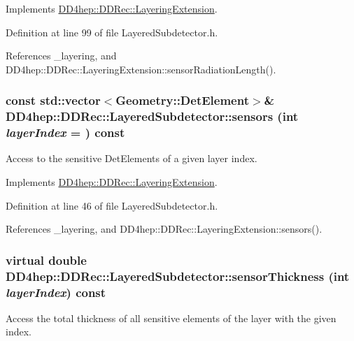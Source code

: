 Implements \hyperlink{class_d_d4hep_1_1_d_d_rec_1_1_layering_extension_a1328587b943abe82353de131d9fac071}{DD4hep::DDRec::LayeringExtension}.

Definition at line 99 of file LayeredSubdetector.h.

References \_\-layering, and DD4hep::DDRec::LayeringExtension::sensorRadiationLength().\hypertarget{class_d_d4hep_1_1_d_d_rec_1_1_layered_subdetector_aaa4246ef49e83aa4ab6ec6f2177ddf1c}{
\subsubsection[{sensors}]{\setlength{\rightskip}{0pt plus 5cm}const std::vector$<${\bf Geometry::DetElement}$>$\& DD4hep::DDRec::LayeredSubdetector::sensors (int {\em layerIndex} = {}) const}}
\label{class_d_d4hep_1_1_d_d_rec_1_1_layered_subdetector_aaa4246ef49e83aa4ab6ec6f2177ddf1c}


Access to the sensitive DetElements of a given layer index. 

Implements \hyperlink{class_d_d4hep_1_1_d_d_rec_1_1_layering_extension_a832e6f67c9e507b89f8f41d0a5cc0025}{DD4hep::DDRec::LayeringExtension}.

Definition at line 46 of file LayeredSubdetector.h.

References \_\-layering, and DD4hep::DDRec::LayeringExtension::sensors().\hypertarget{class_d_d4hep_1_1_d_d_rec_1_1_layered_subdetector_aa373ff4546aace1d8049e19b8ef8874f}{
\subsubsection[{sensorThickness}]{\setlength{\rightskip}{0pt plus 5cm}virtual double DD4hep::DDRec::LayeredSubdetector::sensorThickness (int {\em layerIndex}) const}}
\label{class_d_d4hep_1_1_d_d_rec_1_1_layered_subdetector_aa373ff4546aace1d8049e19b8ef8874f}


Access the total thickness of all sensitive elements of the layer with the given index. 

